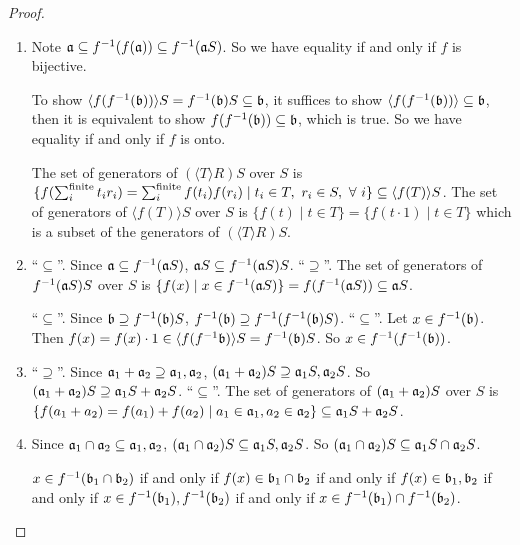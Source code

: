 \begin{proof}
    \begin{enumerate}
        \item 
            Note $\mathfrak{a} \subseteq f^{-1}(f(\mathfrak{a})) \subseteq f^{-1}(\mathfrak{a} S)$. So we have equality if and only if $f$ is bijective. \par
            To show $\langle f(f^{-1}(\mathfrak{b})) \rangle S = f^{-1}(\mathfrak{b})S \subseteq \mathfrak{b}$, it suffices to show $\langle f(f^{-1}(\mathfrak{b})) \rangle \subseteq \mathfrak{b}$, then it is equivalent to show $f(f^{-1}(\mathfrak{b})) \subseteq \mathfrak{b}$, which is true. So we have equality if and only if $f$ is onto. \par
            The set of generators of $(\langle T \rangle R)S$ over $S$ is $\{f(\sum_i^{\text{finite}}t_ir_i) = \sum_i^{\text{finite}} f(t_i)f(r_i) \mid t_i \in T,\ r_i \in S, \ \forall \  i\} \subseteq \langle f(T) \rangle S$. The set of generators of $\langle f(T) \rangle S$ over $S$ is $\{f(t) \mid t \in T\} = \{f(t \cdot 1) \mid t \in T\}$ which is a subset of the generators of $(\langle T \rangle R)S$.
        \item 
            ``$\subseteq$''. Since $\mathfrak{a} \subseteq f^{-1}(\mathfrak{a} S)$, $\mathfrak{a} S \subseteq f^{-1}(\mathfrak{a} S)S$. ``$\supseteq$''. The set of generators of $f^{-1}(\mathfrak{a} S)S$ over $S$ is $\{f(x) \mid x \in f^{-1}(\mathfrak{a} S)\} = f(f^{-1}(\mathfrak{a} S)) \subseteq \mathfrak{a} S$. \par
            ``$\subseteq$''. Since $\mathfrak{b} \supseteq f^{-1}(\mathfrak{b})S$, $f^{-1}(\mathfrak{b}) \supseteq f^{-1}(f^{-1}(\mathfrak{b})S)$. ``$\subseteq$''. Let $x \in f^{-1}(\mathfrak{b})$. Then $f(x) = f(x) \cdot 1 \in \langle f(f^{-1}\mathfrak{b}) \rangle S = f^{-1}(\mathfrak{b})S$. So $x \in f^{-1}(f^{-1}(\mathfrak{b}))$.
        \item ``$\supseteq$''. Since $\mathfrak{a}_1 + \mathfrak{a}_2 \supseteq \mathfrak{a}_1,\mathfrak{a}_2$, $(\mathfrak{a}_1+\mathfrak{a}_2)S \supseteq \mathfrak{a}_1S,\mathfrak{a}_2S$. So $(\mathfrak{a}_1+\mathfrak{a}_2)S \supseteq \mathfrak{a}_1S + \mathfrak{a}_2S$. ``$\subseteq$''. The set of generators of $(\mathfrak{a}_1+\mathfrak{a}_2)S$ over $S$ is $\{f(a_1+a_2) = f(a_1) + f(a_2) \mid a_1 \in \mathfrak{a}_1,a_2 \in \mathfrak{a}_2\} \subseteq \mathfrak{a}_1 S + \mathfrak{a}_2 S$.         
        \item 
            Since $\mathfrak{a}_1 \cap \mathfrak{a}_2 \subseteq \mathfrak{a}_1,\mathfrak{a}_2$, $(\mathfrak{a}_1 \cap \mathfrak{a}_2)S \subseteq \mathfrak{a}_1S,\mathfrak{a}_2S$. So $(\mathfrak{a}_1 \cap \mathfrak{a}_2) S \subseteq \mathfrak{a}_1 S \cap \mathfrak{a}_2 S$. \par
            $x \in f^{-1}(\mathfrak{b}_1 \cap \mathfrak{b}_2)$ if and only if $f(x) \in \mathfrak{b}_1 \cap \mathfrak{b}_2$ if and only if $f(x) \in \mathfrak{b}_1,\mathfrak{b}_2$ if and only if $x \in f^{-1}(\mathfrak{b}_1),f^{-1}(\mathfrak{b}_2)$ if and only if $x \in f^{-1}(\mathfrak{b}_1) \cap f^{-1}(\mathfrak{b}_2)$.

\end{enumerate}
\end{proof}
